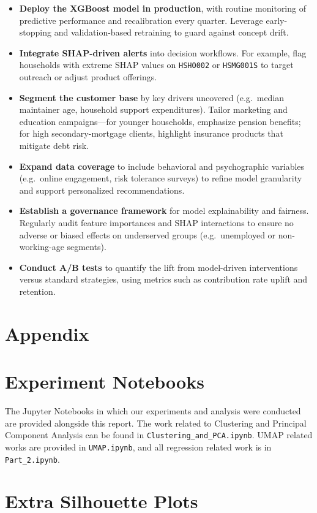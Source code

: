 \documentclass{article}
\begin{document}
\begin{itemize}
  \item \textbf{Deploy the XGBoost model in production}, with routine monitoring of predictive performance and recalibration every quarter. Leverage early-stopping and validation-based retraining to guard against concept drift.
  \item \textbf{Integrate SHAP-driven alerts} into decision workflows. For example, flag households with extreme SHAP values on \texttt{HSHO002} or \texttt{HSMG001S} to target outreach or adjust product offerings.
  \item \textbf{Segment the customer base} by key drivers uncovered (e.g.\ median maintainer age, household support expenditures). Tailor marketing and education campaigns—for younger households, emphasize pension benefits; for high secondary-mortgage clients, highlight insurance products that mitigate debt risk.
  \item \textbf{Expand data coverage} to include behavioral and psychographic variables (e.g.\ online engagement, risk tolerance surveys) to refine model granularity and support personalized recommendations.
  \item \textbf{Establish a governance framework} for model explainability and fairness. Regularly audit feature importances and SHAP interactions to ensure no adverse or biased effects on underserved groups (e.g.\ unemployed or non-working-age segments).
  \item \textbf{Conduct A/B tests} to quantify the lift from model-driven interventions versus standard strategies, using metrics such as contribution rate uplift and retention.
\end{itemize}

\appendix
\section*{Appendix}

\section{Experiment Notebooks}
The Jupyter Notebooks in which our experiments and analysis were conducted are provided alongside this report. The work related to Clustering and Principal Component Analysis can be found in \texttt{Clustering\_and\_PCA.ipynb}. UMAP related works are provided in \texttt{UMAP.ipynb}, and all regression related work is in \texttt{Part\_2.ipynb}.

\section{Extra Silhouette Plots}
\end{document}
